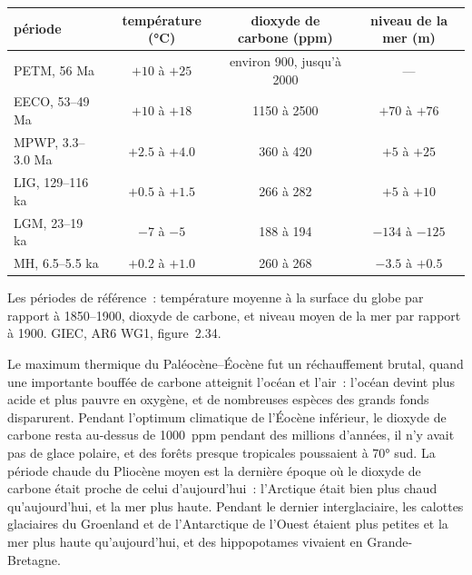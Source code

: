 \begin{center}
\small
\begin{tabular}{|l|c|c|c|}
\hline
\textbf{période} & \textbf{température (\unit{\degreeCelsius})} & \textbf{dioxyde de carbone (ppm)} & \textbf{niveau de la mer (m)} \\
\hline
PETM, 56 Ma & $+10$ à $+25$ & environ 900, jusqu'à 2000 & --- \\
EECO, 53--49 Ma & $+10$ à $+18$ & 1150 à 2500 & $+70$ à $+76$ \\
MPWP, 3.3--3.0 Ma & $+2.5$ à $+4.0$ & 360 à 420 & $+5$ à $+25$ \\
LIG, 129--116 ka & $+0.5$ à $+1.5$ & 266 à 282 & $+5$ à $+10$ \\
\textcolor{omCold}{LGM, 23--19 ka} & \textcolor{omCold}{$-7$ à $-5$} & \textcolor{omCold}{188 à 194} & \textcolor{omCold}{$-134$ à $-125$} \\
MH, 6.5--5.5 ka & $+0.2$ à $+1.0$ & 260 à 268 & $-3.5$ à $+0.5$ \\
\hline
\end{tabular}

\medskip
{\small Les périodes de référence~: température moyenne à la surface du
globe par rapport à 1850--1900, dioxyde de carbone, et niveau moyen de la
mer par rapport à 1900. GIEC, AR6 WG1, figure~2.34.}
\end{center}

Le maximum thermique du Paléocène--Éocène fut un réchauffement brutal,
quand une importante bouffée de carbone atteignit l'océan et l'air~:
l'océan devint plus acide et plus pauvre en oxygène, et de nombreuses
espèces des grands fonds disparurent. Pendant l'optimum climatique de
l'Éocène inférieur, le dioxyde de carbone resta au-dessus de
\qty{1000}{ppm} pendant des millions d'années, il n'y avait pas de glace
polaire, et des forêts presque tropicales poussaient à \ang{70} sud. La
période chaude du Pliocène moyen est la dernière époque où le dioxyde de
carbone était proche de celui d'aujourd'hui~: l'Arctique était bien plus
chaud qu'aujourd'hui, et la mer plus haute. Pendant le dernier
interglaciaire, les calottes glaciaires du Groenland et de l'Antarctique
de l'Ouest étaient plus petites et la mer plus haute qu'aujourd'hui, et des
hippopotames vivaient en Grande-Bretagne.

